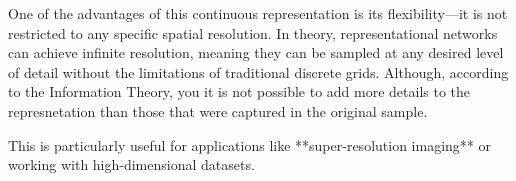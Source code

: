 



One of the advantages of this continuous representation is its flexibility—it is not restricted to any specific spatial resolution. In theory, representational networks can achieve infinite resolution, meaning they can be sampled at any desired level of detail without the limitations of traditional discrete grids. Although, according to the Information Theory, you it is not possible to add more details to the represnetation than those that were captured in the original sample.

This is particularly useful for applications like **super-resolution imaging** or working with high-dimensional datasets.






